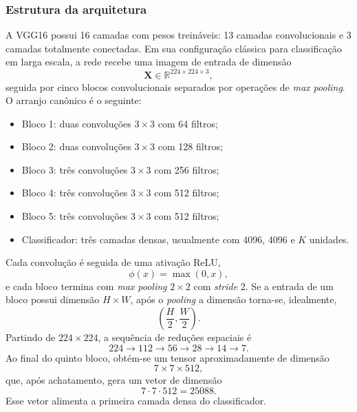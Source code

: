 \documentclass[tcc,capa]{texufpel}
\begin{document}
\subsubsection{Estrutura da arquitetura}

A VGG16 possui 16 camadas com pesos treináveis: 13 camadas convolucionais e 3 camadas totalmente conectadas. Em sua configuração clássica para classificação em larga escala, a rede recebe uma imagem de entrada de dimensão
\begin{equation}
	\mathbf{X} \in \mathbb{R}^{224 \times 224 \times 3},
\end{equation}
seguida por cinco blocos convolucionais separados por operações de \textit{max pooling}. O arranjo canônico é o seguinte:

\begin{itemize}
	\item Bloco 1: duas convoluções \(3\times 3\) com 64 filtros;
	\item Bloco 2: duas convoluções \(3\times 3\) com 128 filtros;
	\item Bloco 3: três convoluções \(3\times 3\) com 256 filtros;
	\item Bloco 4: três convoluções \(3\times 3\) com 512 filtros;
	\item Bloco 5: três convoluções \(3\times 3\) com 512 filtros;
	\item Classificador: três camadas densas, usualmente com 4096, 4096 e \(K\) unidades.
\end{itemize}

Cada convolução é seguida de uma ativação ReLU,
\begin{equation}
	\phi(x)=\max(0,x),
\end{equation}
e cada bloco termina com \textit{max pooling} \(2\times 2\) com \textit{stride} 2. Se a entrada de um bloco possui dimensão \(H\times W\), após o \textit{pooling} a dimensão torna-se, idealmente,
\begin{equation}
	\left(\frac{H}{2}, \frac{W}{2}\right).
\end{equation}
Partindo de \(224\times 224\), a sequência de reduções espaciais é
\begin{equation}
	224 \rightarrow 112 \rightarrow 56 \rightarrow 28 \rightarrow 14 \rightarrow 7.
\end{equation}
Ao final do quinto bloco, obtém-se um tensor aproximadamente de dimensão
\begin{equation}
	7 \times 7 \times 512,
\end{equation}
que, após achatamento, gera um vetor de dimensão
\begin{equation}
	7 \cdot 7 \cdot 512 = 25088.
\end{equation}
Esse vetor alimenta a primeira camada densa do classificador.
\end{document}
